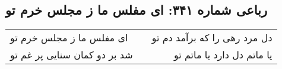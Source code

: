 \begin{center}
\section*{رباعی شماره ۳۴۱: ای مفلس ما ز مجلس خرم تو}
\label{sec:sh341}
\begin{longtable}{l p{0.5cm} r}
ای مفلس ما ز مجلس خرم تو
&&
دل مرد رهی را که برآمد دم تو
\\
شد بر دو کمان سنایی پر غم تو
&&
یا ماتم دل دارد یا ماتم تو
\\
\end{longtable}
\end{center}
